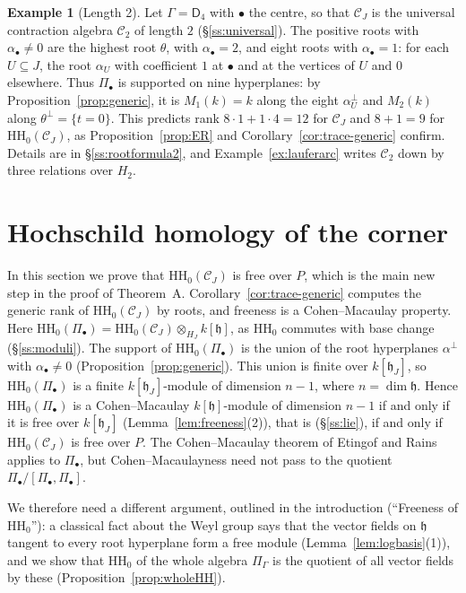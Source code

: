 \documentclass[11pt]{amsart}
\numberwithin{table}{section}
\numberwithin{figure}{section}
\numberwithin{equation}{section}
\theoremstyle{definition}
\newtheorem{ex}[thm]{Example}
\theoremstyle{plain}
\newcommand{\cC}{\mathcal{C}}
\newcommand{\h}{\mathfrak{h}}
\newcommand{\bul}{\bullet}
\newcommand{\HH}{\mathrm{HH}}
\begin{document}
\begin{ex}[Length 2]\label{ex:running}
Let $\Gamma = \mathsf{D}_4$ with $\bul$ the centre, so that $\cC_J$ is the universal contraction algebra $\cC_2$ of length $2$ (\S\ref{ss:universal}). The positive roots with $\alpha_\bul \neq 0$ are the highest root $\theta$, with $\alpha_\bul = 2$, and eight roots with $\alpha_\bul = 1$: for each $U \subseteq J$, the root $\alpha_U$ with coefficient $1$ at $\bul$ and at the vertices of $U$ and $0$ elsewhere. Thus $\Pi_\bul$ is supported on nine hyperplanes: by Proposition~\ref{prop:generic}, it is $M_1(k) = k$ along the eight $\alpha_U^\perp$ and $M_2(k)$ along $\theta^\perp = \{t = 0\}$. This predicts rank $8\cdot 1 + 1\cdot 4 = 12$ for $\cC_J$ and $8 + 1 = 9$ for $\HH_0(\cC_J)$, as Proposition~\ref{prop:ER} and Corollary~\ref{cor:trace-generic} confirm. Details are in \S\ref{ss:rootformula2}, and Example~\ref{ex:lauferarc} writes $\cC_2$ down by three relations over $H_2$.
\end{ex}



%
\section{\texorpdfstring{Hochschild homology of the corner}{Hochschild homology of the corner}}\label{sec:squeeze}

In this section we prove that $\HH_0(\cC_J)$ is free over $P$, which is the main new step in the proof of Theorem~A. Corollary~\ref{cor:trace-generic} computes the generic rank of $\HH_0(\cC_J)$ by roots, and freeness is a Cohen--Macaulay property. Here $\HH_0(\Pi_\bul) = \HH_0(\cC_J) \otimes_{H_J} k[\h]$, as $\HH_0$ commutes with base change (\S\ref{ss:moduli}). The support of $\HH_0(\Pi_\bul)$ is the union of the root hyperplanes $\alpha^\perp$ with $\alpha_\bul \neq 0$ (Proposition~\ref{prop:generic}). This union is finite over $k[\h_J]$, so $\HH_0(\Pi_\bul)$ is a finite $k[\h_J]$-module of dimension $n - 1$, where $n = \dim \h$. Hence $\HH_0(\Pi_\bul)$ is a Cohen--Macaulay $k[\h]$-module of dimension $n - 1$ if and only if it is free over $k[\h_J]$ (Lemma~\ref{lem:freeness}(2)), that is (\S\ref{ss:lie}), if and only if $\HH_0(\cC_J)$ is free over $P$. The Cohen--Macaulay theorem of Etingof and Rains applies to $\Pi_\bul$, but Cohen--Macaulayness need not pass to the quotient $\Pi_\bul/[\Pi_\bul, \Pi_\bul]$.

We therefore need a different argument, outlined in the introduction (``Freeness of $\HH_0$''): a classical fact about the Weyl group says that the vector fields on $\h$ tangent to every root hyperplane form a free module (Lemma~\ref{lem:logbasis}(1)), and we show that $\HH_0$ of the whole algebra $\Pi_\Gamma$ is the quotient of all vector fields by these (Proposition~\ref{prop:wholeHH}).
\end{document}
